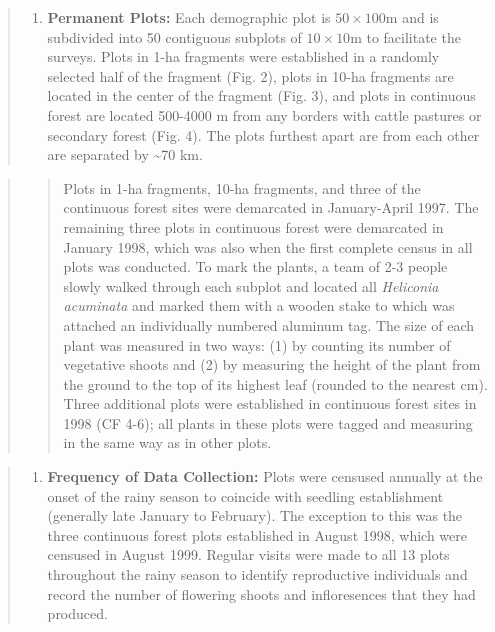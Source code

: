 \documentclass[
  12pt,
  man, donotrepeattitle,floatsintext]{apa6}
\providecommand{\tightlist}{%
  \setlength{\itemsep}{0pt}\setlength{\parskip}{0pt}}
\begin{document}
\begin{quote}
\begin{enumerate}
\def\labelenumi{\alph{enumi}.}
\setcounter{enumi}{1}
\tightlist
\item
  \textbf{Permanent Plots:} Each demographic plot is \(50\times100\)m and is subdivided into 50 contiguous subplots of \(10\times10\)m to facilitate the surveys. Plots in 1-ha fragments were established in a randomly selected half of the fragment (Fig. 2), plots in 10-ha fragments are located in the center of the fragment (Fig. 3), and plots in continuous forest are located 500-4000 m from any borders with cattle pastures or secondary forest (Fig. 4). The plots furthest apart are from each other are separated by \textasciitilde70 km.
\end{enumerate}
\end{quote}

\begin{quote}
\begin{quote}
Plots in 1-ha fragments, 10-ha fragments, and three of the continuous forest sites were demarcated in January-April 1997. The remaining three plots in continuous forest were demarcated in January 1998, which was also when the first complete census in all plots was conducted. To mark the plants, a team of 2-3 people slowly walked through each subplot and located all \emph{Heliconia acuminata} and marked them with a wooden stake to which was attached an individually numbered aluminum tag. The size of each plant was measured in two ways: (1) by counting its number of vegetative shoots and (2) by measuring the height of the plant from the ground to the top of its highest leaf (rounded to the nearest cm). Three additional plots were established in continuous forest sites in 1998 (CF 4-6); all plants in these plots were tagged and measuring in the same way as in other plots.
\end{quote}
\end{quote}

\begin{quote}
\begin{enumerate}
\def\labelenumi{\alph{enumi}.}
\setcounter{enumi}{2}
\tightlist
\item
  \textbf{Frequency of Data Collection:} Plots were censused annually at the onset of the rainy season to coincide with seedling establishment (generally late January to February). The exception to this was the three continuous forest plots established in August 1998, which were censused in August 1999. Regular visits were made to all 13 plots throughout the rainy season to identify reproductive individuals and record the number of flowering shoots and infloresences that they had produced.
\end{enumerate}
\end{quote}
\end{document}
